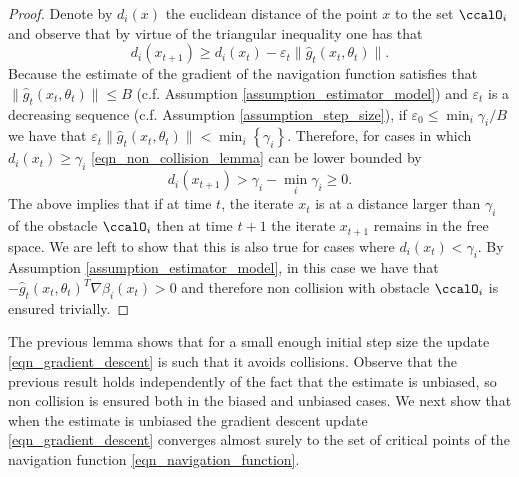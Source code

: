 \documentclass[article]{IEEEtran}
\theoremstyle{definition}
\begin{document}
\begin{proof}
Denote by $d_i(x)$ the euclidean distance of the point $x$ to the set $\ccalO_i$ and observe that by virtue of the triangular inequality one has that
%
\begin{equation}\label{eqn_non_collision_lemma}
d_i(x_{t+1}) \geq d_i(x_{t})-\varepsilon_t \|\hat{g}_t(x_t,\theta_t)\|. 
\end{equation}
%
Because the estimate of the gradient of the navigation function satisfies that $\|\hat{g}_t(x_t,\theta_t) \| \leq B$ (c.f. Assumption \ref{assumption_estimator_model}) and $\varepsilon_t$ is a decreasing sequence (c.f. Assumption \ref{assumption_step_size}), if $\varepsilon_0 \leq \min_i\gamma_i /B$ we have that $\varepsilon_t \|\hat{g}_t(x_t,\theta_t)\| < \min_i\left\{\gamma_i \right\}$. Therefore, for cases in which $d_i(x_t)\geq \gamma_i$ \eqref{eqn_non_collision_lemma} can be lower bounded by
%
\begin{equation}
d_i(x_{t+1}) > \gamma_i- \min_i\gamma_i \geq 0.
\end{equation}
%
The above implies that if at time $t$, the iterate $x_t$ is at a distance larger than $\gamma_i$ of the obstacle $\ccalO_i$ then at time $t+1$ the iterate $x_{t+1}$ remains in the free space. We are left to show that this is also true for cases where $d_i(x_t) <\gamma_i$. By Assumption \ref{assumption_estimator_model}, in this case we have that $-\hat{g}_t(x_t,\theta_t)^T \nabla \beta_i(x_t) >0$ and therefore non collision with obstacle $\ccalO_i$ is ensured trivially.
\end{proof}
%
The previous lemma shows that for a small enough initial step size the update \eqref{eqn_gradient_descent} is such that it avoids collisions. Observe that the previous result holds independently of the fact that the estimate is unbiased, so non collision is ensured both in the biased and unbiased cases. We next show that when the estimate is unbiased the gradient descent update \eqref{eqn_gradient_descent} converges almost surely to the set of critical points of the navigation function \eqref{eqn_navigation_function}. 
\end{document}
